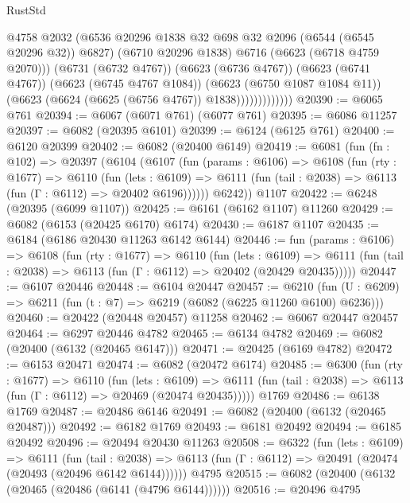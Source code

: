 \begin{lexlean}{RustStd}
\begin{coremodule}
                            @4758
                            @2032
                            (@6536 @20296 @1838 @32 @698 @32 @2096 (@6544 (@6545 @20296 @32)) @6827)
                            (@6710 @20296 @1838)
                            @6716
                            (@6623 (@6718 @4759 @2070)))
                          (@6731 (@6732 @4767))
                          (@6623 (@6736 @4767))
                          (@6623 (@6741 @4767))
                          (@6623 (@6745 @4767 @1084))
                          (@6623 (@6750 @1087 @1084 @11))
                          (@6623 (@6624 (@6625 (@6756 @4767)) @1838)))))))))))))
@20390 := @6065 @761
@20394 := @6067 (@6071 @761) (@6077 @761)
@20395 := @6086 @11257
@20397 := @6082 (@20395 @6101)
@20399 := @6124 (@6125 @761)
@20400 := @6120 @20399
@20402 := @6082 (@20400 @6149)
@20419 := @6081
    (fun (fn : @102) =>
    @20397
      (@6104
        (@6107
          (fun (params : @6106) =>
          @6108
            (fun (rty : @1677) =>
            @6110
              (fun (lets : @6109) =>
              @6111 (fun (tail : @2038) => @6113 (fun (Γ : @6112) => @20402 @6196))))))
        @6242))
    @1107
@20422 := @6248 (@20395 (@6099 @1107))
@20425 := @6161 (@6162 @1107) @11260
@20429 := @6082 (@6153 (@20425 @6170) @6174)
@20430 := @6187 @1107
@20435 := @6184 (@6186 @20430 @11263 @6142 @6144)
@20446 := fun (params : @6106) =>
  @6108
    (fun (rty : @1677) =>
    @6110
      (fun (lets : @6109) =>
      @6111 (fun (tail : @2038) => @6113 (fun (Γ : @6112) => @20402 (@20429 @20435)))))
@20447 := @6107 @20446
@20448 := @6104 @20447
@20457 := @6210
    (fun (U : @6209) => @6211 (fun (t : @7) => @6219 (@6082 (@6225 @11260 @6100) @6236)))
@20460 := @20422 (@20448 @20457) @11258
@20462 := @6067 @20447 @20457
@20464 := @6297 @20446 @4782
@20465 := @6134 @4782
@20469 := @6082 (@20400 (@6132 (@20465 @6147)))
@20471 := @20425 (@6169 @4782)
@20472 := @6153 @20471
@20474 := @6082 (@20472 @6174)
@20485 := @6300
    (fun (rty : @1677) =>
    @6110
      (fun (lets : @6109) =>
      @6111 (fun (tail : @2038) => @6113 (fun (Γ : @6112) => @20469 (@20474 @20435)))))
    @1769
@20486 := @6138 @1769
@20487 := @20486 @6146
@20491 := @6082 (@20400 (@6132 (@20465 @20487)))
@20492 := @6182 @1769
@20493 := @6181 @20492
@20494 := @6185 @20492
@20496 := @20494 @20430 @11263
@20508 := @6322
    (fun (lets : @6109) =>
    @6111
      (fun (tail : @2038) =>
      @6113 (fun (Γ : @6112) => @20491 (@20474 (@20493 (@20496 @6142 @6144))))))
    @4795
@20515 := @6082 (@20400 (@6132 (@20465 (@20486 (@6141 (@4796 @6144))))))
@20516 := @20496 @4795

\end{coremodule}
\end{lexlean}
